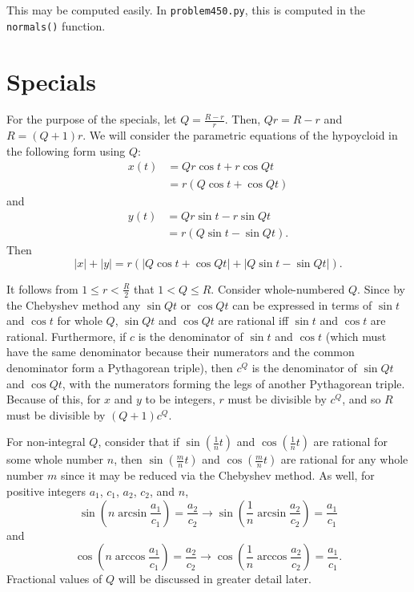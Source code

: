 \documentclass[12pt]{article}
\begin{document}
This may be computed easily. In \texttt{problem450.py}, this is computed in the \texttt{normals()} function.

\section{Specials}

For the purpose of the specials, let $Q = \frac{R-r}{r}$. Then, $Qr = R - r$ and $R = (Q + 1)r$. We will consider the parametric equations of the hypoycloid in the following form using $Q$:
\begin{align*}
  x(t) &= Qr \cos t + r\cos Qt \\
  &= r(Q\cos t + \cos Qt)
\end{align*}
and 
\begin{align*}
  y(t) &= Qr \sin t - r\sin Qt \\
  &= r(Q\sin t - \sin Qt).
\end{align*}
Then \[ |x| + |y| = r(|Q\cos t + \cos Qt| + |Q\sin t - \sin Qt|). \]

It follows from $1 \le r < \frac{R}{2}$ that $1 < Q \le R$. Consider whole-numbered $Q$. Since by the Chebyshev method any $\sin Qt$ or $\cos Qt$ can be expressed in terms of $\sin t$ and $\cos t$ for whole $Q$, $\sin Qt$ and $\cos Qt$ are rational iff $\sin t$ and $\cos t$ are rational. Furthermore, if $c$ is the denominator of $\sin t$ and $\cos t$ (which must have the same denominator because their numerators and the common denominator form a Pythagorean triple), then $c^Q$ is the denominator of $\sin Qt$ and $\cos Qt$, with the numerators forming the legs of another Pythagorean triple. Because of this, for $x$ and $y$ to be integers, $r$ must be divisible by $c^Q$, and so $R$ must be divisible by $(Q+1)c^Q$.

For non-integral $Q$, consider that if $\sin(\frac{1}{n} t)$ and $\cos(\frac{1}{n} t)$ are rational for some whole number $n$, then $\sin(\frac{m}{n} t)$ and $\cos(\frac{m}{n} t)$ are rational for any whole number $m$ since it may be reduced via the Chebyshev method. As well, for positive integers $a_1$, $c_1$, $a_2$, $c_2$, and $n$, \[ \sin\left(n \arcsin\frac{a_1}{c_1}\right) = \frac{a_2}{c_2} \rightarrow \sin\left(\frac{1}{n} \arcsin\frac{a_2}{c_2}\right) = \frac{a_1}{c_1} \] and \[ \cos\left(n \arccos\frac{a_1}{c_1}\right) = \frac{a_2}{c_2} \rightarrow \cos\left(\frac{1}{n} \arccos\frac{a_2}{c_2}\right) = \frac{a_1}{c_1}. \] Fractional values of $Q$ will be discussed in greater detail later.
\end{document}
